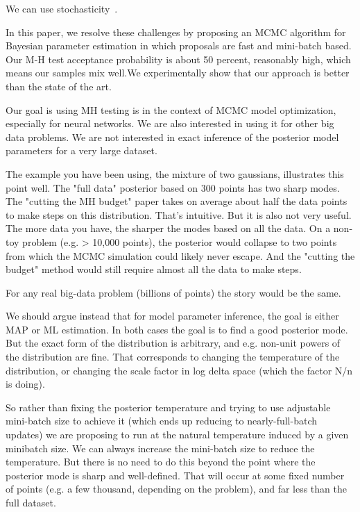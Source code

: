 \documentclass{article}
\begin{document}
We can use stochasticity~\cite{RobbinsMonro1951}.

In this paper, we resolve these challenges by proposing an MCMC algorithm for Bayesian parameter
estimation in which proposals are fast and mini-batch based. Our M-H test acceptance probability is
about 50 percent, reasonably high, which means our samples mix well.We experimentally show that our
approach is better than the state of the art.

Our goal is using MH testing is in the context of MCMC model optimization, especially for neural
networks. We are also interested in using it for other big data problems. We are not interested in
exact inference of the posterior model parameters for a very large dataset. 

The example you have been using, the mixture of two gaussians, illustrates this point well. The
"full data" posterior  based on 300 points has two sharp modes. The "cutting the MH budget" paper
takes on average about half the data points to make steps on this distribution. That's intuitive.
But it is also not very useful. The more data you have, the sharper the modes based on all the data.
On a non-toy problem (e.g. > 10,000 points), the posterior would collapse to two points from which
the MCMC simulation could likely never escape. And the "cutting the budget" method would still
require almost all the data to make steps. 

For any real big-data problem (billions of points) the story would be the same. 

We should argue instead that for model parameter inference, the goal is either MAP or ML estimation.
In both cases the goal is to find a good posterior mode. But the exact form of the distribution is
arbitrary, and e.g. non-unit powers of the distribution are fine. That corresponds to changing the
temperature of the distribution, or changing the scale factor in log delta space (which the factor
N/n is doing). 

So rather than fixing the posterior temperature and trying to use adjustable mini-batch size to
achieve it (which ends up reducing to nearly-full-batch updates) we are proposing to run at the
natural temperature induced by a given minibatch size. We can always increase the mini-batch size to
reduce the temperature. But there is no need to do this beyond the point where the posterior mode is
sharp and well-defined. That will occur at some fixed number of points (e.g. a few thousand,
depending on the problem), and far less than the full dataset.
\end{document}
